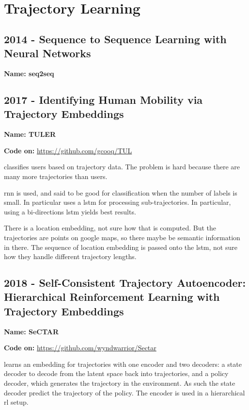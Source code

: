 \section{Trajectory Learning}\label{sec: traj learning}

\subsection*{2014 - Sequence to Sequence Learning with Neural Networks}

\textbf{Name: seq2seq}

\cite{sutskever2014sequence}

\subsection*{2017 - Identifying Human Mobility via Trajectory Embeddings}

\textbf{Name: TULER}

\textbf{Code on:} \url{https://github.com/gcooq/TUL}

\cite{gao2017identifying} classifies users based on trajectory data. The problem is hard because there are many more trajectories than users.

\gls{rnn} is used, and said to be good for classification when the number of labels is small. In particular uses a \gls{lstm} for processing sub-trajectories.
%
In particular, using a bi-directions \gls{lstm} yields best results. 

There is a location embedding, not sure how that is computed. But the trajectories are points on google maps, so there maybe be semantic information in there.
%
The sequence of location embedding is passed onto the \gls{lstm}, not sure how they handle different trajectory lengths.


\subsection*{2018 - Self-Consistent Trajectory Autoencoder: Hierarchical Reinforcement Learning with Trajectory Embeddings}

\textbf{Name: SeCTAR}

\textbf{Code on:} \url{https://github.com/wyndwarrior/Sectar}

\cite{co2018self} learns an embedding for trajectories with one encoder and two decoders: a state decoder to decode from the latent space back into trajectories, and a policy decoder, which generates the trajectory in the environment. As such the state decoder predict the trajectory of the policy. The encoder is used in a hierarchical \gls{rl} setup.

